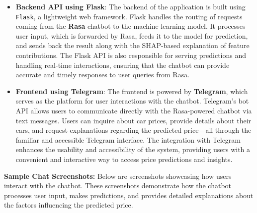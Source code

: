 \documentclass[a4paper,12pt]{article}
\begin{document}
\begin{justify}
\begin{itemize}
	\item \textbf{Backend API using Flask}: The backend of the application is built using \texttt{Flask}, a lightweight web framework. Flask handles the routing of requests coming from the \textbf{Rasa} chatbot to the machine learning model. It processes user input, which is forwarded by Rasa, feeds it to the model for prediction, and sends back the result along with the SHAP-based explanation of feature contributions. The Flask API is also responsible for serving predictions and handling real-time interactions, ensuring that the chatbot can provide accurate and timely responses to user queries from Rasa.

		
		\item \textbf{Frontend using Telegram}: The frontend is powered by \textbf{Telegram}, which serves as the platform for user interactions with the chatbot. Telegram’s bot API allows users to communicate directly with the Rasa-powered chatbot via text messages. Users can inquire about car prices, provide details about their cars, and request explanations regarding the predicted price—all through the familiar and accessible Telegram interface. The integration with Telegram enhances the usability and accessibility of the system, providing users with a convenient and interactive way to access price predictions and insights.
	\end{itemize}
	


\textbf{Sample Chat Screenshots:} Below are screenshots showcasing how users interact with the chatbot. These screenshots demonstrate how the chatbot processes user input, makes predictions, and provides detailed explanations about the factors influencing the predicted price.


\end{justify}
\end{document}
